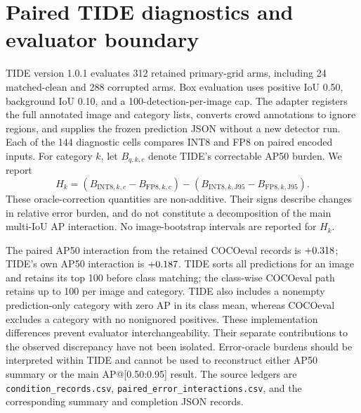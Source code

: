 \documentclass[10pt]{article}
\newcommand{\Jclean}{\mathrm{J95}}
\begin{document}
\FloatBarrier

\section{Paired TIDE diagnostics and evaluator boundary}

TIDE version 1.0.1 evaluates 312 retained primary-grid arms, including 24 matched-clean and 288 corrupted arms. Box evaluation uses positive IoU 0.50, background IoU 0.10, and a 100-detection-per-image cap. The adapter registers the full annotated image and category lists, converts crowd annotations to ignore regions, and supplies the frozen prediction JSON without a new detector run. Each of the 144 diagnostic cells compares INT8 and FP8 on paired encoded inputs. For category $k$, let $B_{q,k,c}$ denote TIDE's correctable AP50 burden. We report
\[
H_k=(B_{\mathrm{INT8},k,c}-B_{\mathrm{FP8},k,c})
 -(B_{\mathrm{INT8},k,\Jclean}-B_{\mathrm{FP8},k,\Jclean}).
\]
These oracle-correction quantities are non-additive. Their signs describe changes in relative error burden, and do not constitute a decomposition of the main multi-IoU AP interaction. No image-bootstrap intervals are reported for $H_k$.

\begin{table}[htbp]
\centering\small
\caption{Equal-cell mean paired TIDE burden interactions in AP50 points. Each dataset contributes 36 cells; all contributes 144. Cls: classification; Loc: localization; Both: their joint error category; Dupe: duplicates; Bkg: background.}
\label{tab:tide-burdens}

\end{table}

The paired AP50 interaction from the retained COCOeval records is $+0.318$; TIDE's own AP50 interaction is $+0.187$. TIDE sorts all predictions for an image and retains its top 100 before class matching; the class-wise COCOeval path retains up to 100 per image and category. TIDE also includes a nonempty prediction-only category with zero AP in its class mean, whereas COCOeval excludes a category with no nonignored positives. These implementation differences prevent evaluator interchangeability. Their separate contributions to the observed discrepancy have not been isolated. Error-oracle burdens should be interpreted within TIDE and cannot be used to reconstruct either AP50 summary or the main AP@[0.50:0.95] result. The source ledgers are \texttt{condition\_records.csv}, \texttt{paired\_error\_interactions.csv}, and the corresponding summary and completion JSON records.
\end{document}
